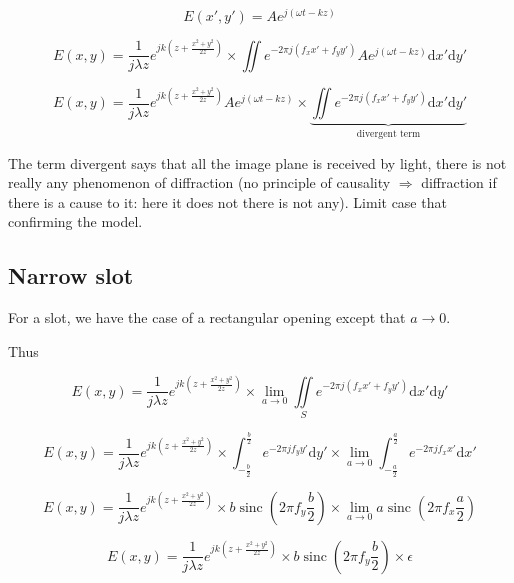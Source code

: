 \documentclass[10pt,a4paper]{article}
\DeclareMathOperator{\sinc}{sinc}
\begin{document}
\[E(x',y')=Ae^{j(\omega t-kz)}\]

\[
E(x,y)=\frac{1}{j\lambda z} e^{jk\left(z+\frac{x^2+y^2}{2z}\right)}
\times \iint e^{-2\pi j(f_xx'+f_yy')}
Ae^{j(\omega t-kz)}\mathrm{d}x'\mathrm{d}y'
\]

\[
E(x,y)=\frac{1}{j\lambda z} e^{jk\left(z+\frac{x^2+y^2}{2z}\right)} Ae^{j(\omega t-kz)}
\times \underbrace{
	\iint e^{-2\pi j(f_xx'+f_yy')}
	\mathrm{d}x'\mathrm{d}y'
}_\text{divergent term}
\]

The term divergent says that all the image plane is received by light, there is not really any phenomenon of diffraction (no principle of causality $\Rightarrow$ diffraction if there is a cause to it: here it does not there is not any). Limit case that confirming the model.

	\subsection{Narrow slot}
For a slot, we have the case of a rectangular opening except that $a\rightarrow 0$.

Thus
	
\[
E(x,y)=\frac{1}{j\lambda z} e^{jk\left(z+\frac{x^2+y^2}{2z}\right)}
\times \lim_{a\rightarrow 0} \iint\limits_S e^{-2\pi j(f_xx'+f_yy')}\mathrm{d}x'\mathrm{d}y'
\]

\[
E(x,y)=\frac{1}{j\lambda z} e^{jk\left(z+\frac{x^2+y^2}{2z}\right)}
\times \int_{-\frac{b}{2}}^\frac{b}{2} e^{-2\pi jf_yy'}\mathrm{d}y'
\times \lim_{a\rightarrow 0} \int_{-\frac{a}{2}}^\frac{a}{2} e^{-2\pi jf_xx'}\mathrm{d}x'
\]

\[
E(x,y)=\frac{1}{j\lambda z} e^{jk\left(z+\frac{x^2+y^2}{2z}\right)}
\times b\sinc\left(2\pi f_y \frac{b}{2}\right)
\times \lim_{a\rightarrow 0}a\sinc\left(2\pi f_x \frac{a}{2}\right)
\]

\[
E(x,y)=\frac{1}{j\lambda z} e^{jk\left(z+\frac{x^2+y^2}{2z}\right)}
\times b\sinc\left(2\pi f_y \frac{b}{2}\right)
\times \epsilon
\]
\end{document}

